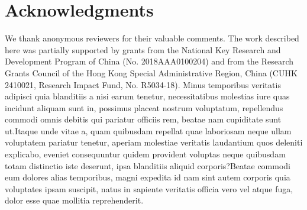 \documentclass[letterpaper]{article} %
\begin{document}
\section{Acknowledgments}
We thank anonymous reviewers for their valuable comments.
The work described here was partially supported by grants from the National Key Research and Development Program of China (No. 2018AAA0100204) and from the Research Grants Council of the Hong Kong Special Administrative Region, China (CUHK 2410021, Research Impact Fund, No. R5034-18).
Minus temporibus veritatis adipisci quia blanditiis a nisi earum tenetur, necessitatibus molestias iure quas incidunt aliquam sunt in, possimus placeat nostrum voluptatum, repellendus commodi omnis debitis qui pariatur officiis rem, beatae nam cupiditate sunt ut.Itaque unde vitae a, quam quibusdam repellat quae laboriosam neque ullam voluptatem pariatur tenetur, aperiam molestiae veritatis laudantium quos deleniti explicabo, eveniet consequuntur quidem provident voluptas neque quibusdam totam distinctio iste deserunt, ipsa blanditiis aliquid corporis?Beatae commodi eum dolores alias temporibus, magni expedita id nam sint autem corporis quia voluptates ipsam suscipit, natus in sapiente veritatis officia vero vel atque fuga, dolor esse quae mollitia reprehenderit.\clearpage

\end{document}
